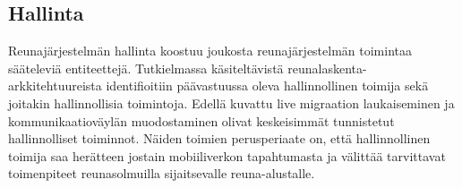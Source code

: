 \subsection{Hallinta}




Reunajärjestelmän hallinta koostuu joukosta reunajärjestelmän toimintaa sääteleviä entiteettejä. 
Tutkielmassa käsiteltävistä reunalaskenta-arkkitehtuureista identifioitiin päävastuussa oleva hallinnollinen toimija sekä joitakin hallinnollisia toimintoja.
Edellä kuvattu live migraation laukaiseminen ja kommunikaatioväylän muodostaminen olivat keskeisimmät tunnistetut hallinnolliset toiminnot.
Näiden toimien perusperiaate on, että hallinnollinen toimija saa herätteen jostain mobiiliverkon tapahtumasta ja välittää tarvittavat toimenpiteet reunasolmuilla sijaitsevalle reuna-alustalle. 



